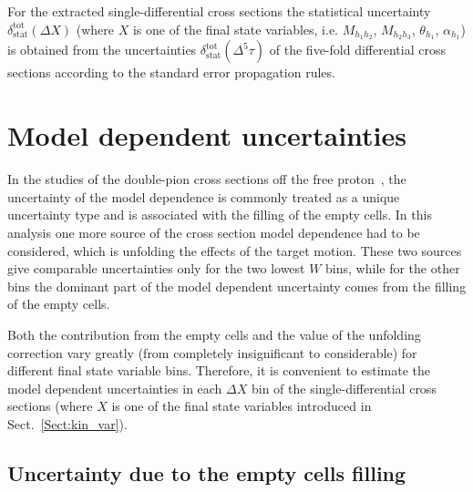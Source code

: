 For the extracted  single-differential cross sections the statistical uncertainty $\delta_{\text{stat}}^{\text{tot}}(\Delta X)$ (where $X$ is one of the final state variables, i.e. $M_{h_{1}h_{2}}$, $M_{h_{2}h_{3}}$, $\theta_{h_1}$, $\alpha_{h_1}$) is obtained from the uncertainties  $\delta_{\text{stat}}^{\text{tot}}(\Delta^{5} \tau)$ of the five-fold differential cross sections according to the standard error propagation rules.




\section{Model dependent uncertainties}
\label{Sect:mod_dep}
In the studies of the double-pion cross sections off the free proton~\cite{Rip_an_note:2002,Ripani:2002ss,Fed_an_note:2007,Fedotov:2008aa,Isupov:2017lnd,Arjun,Fed_an_note:2017,Fed_paper_2018}, the uncertainty of the model dependence is commonly treated as a unique uncertainty type and is associated with the filling of the empty cells. In this analysis one more source of the cross section model dependence had to be considered, which is unfolding the effects of the target motion. These two sources give comparable uncertainties only for the two lowest $W$ bins, while for the other bins the dominant part of the model dependent uncertainty comes from the filling of the empty cells.

Both the contribution from the empty cells and the value of the unfolding correction vary greatly (from completely insignificant to considerable) for different final state variable bins. Therefore, it is convenient to estimate the model dependent uncertainties in each $\Delta X$ bin of the single-differential cross sections (where $X$ is one of the final state variables introduced in Sect.~\ref{Sect:kin_var}).


\subsection{Uncertainty due to the empty cells filling}


